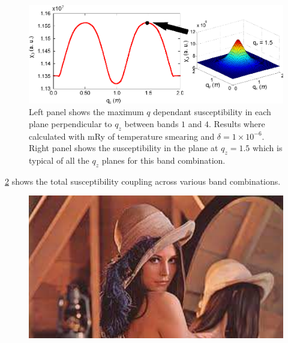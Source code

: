 \begin{figure}[htbp]
    \begin{center}
        \includegraphics[scale=0.9]{Chapter3-dHvABaFe2P2/Figures/AngleDepMeasurements/SusceptibilityEnhancement/SusceptibilityEnhancement}
        \caption{Left panel shows the maximum $q$ dependant susceptibility in each plane perpendicular to $q_z$ between bands $1$ and $4$. Results where calculated with \unit[1]{mRy} of temperature smearing and $\delta=1\times10^{-6}$. Right panel shows the susceptibility in the plane at $q_z=1.5$ which is typical of all the $q_z$ planes for this band combination.}
        \label{Fig:3:SusceptbilityEnhancement}
    \end{center}
\end{figure}

\Fig\ref{Fig:3:FullSusceptibility} shows the total susceptibility coupling across various band combinations.

\begin{figure}[htbp]
    \begin{center}
        \includegraphics[scale=0.7]{Misc/TODO}
        \caption{}
        \label{Fig:3:FullSusceptibility}
    \end{center}
\end{figure}

